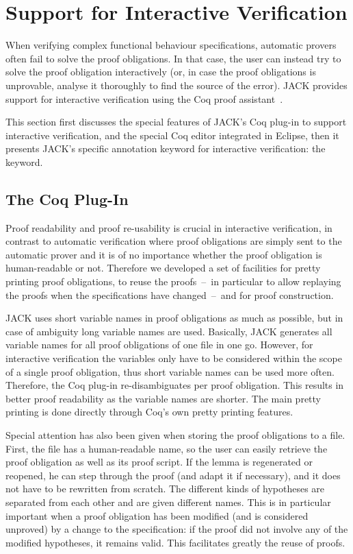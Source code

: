 

\section{Support for Interactive Verification}\label{SecInteractive}
When verifying complex functional behaviour specifications, automatic
provers often fail to solve the proof obligations. In that case, the
user can instead try to solve the proof obligation interactively (or,
in case the proof obligations is unprovable, analyse it thoroughly to
find the source of the error). JACK provides support for interactive
verification using the Coq proof assistant~\cite{Coq04}.

This section first discusses the special features of JACK's Coq
plug-in to support interactive verification, and the special Coq
editor integrated in Eclipse, then it presents JACK's specific
annotation keyword for interactive verification: the \native keyword.

\subsection{The Coq Plug-In}

Proof readability and proof re-usability is crucial in interactive
verification, in contrast to automatic verification where proof
obligations are simply sent to the automatic prover and it is of no
importance whether the proof obligation is human-readable or not.
Therefore we developed a set of facilities for pretty printing proof
obligations, to reuse the proofs~--~in particular to allow replaying
the proofs when the specifications have changed~--~and for proof
construction.

JACK uses short variable names in proof obligations as much as
possible, but in case of ambiguity long variable names are used.
Basically, JACK generates all variable names for all proof obligations
of one file in one go. However, for interactive verification the
variables only have to be considered within the scope of a single
proof obligation, thus short variable names can be used more often.
Therefore, the Coq plug-in re-disambiguates per proof obligation.
This results in better proof readability as the variable names are
shorter.  The main pretty printing is done directly through Coq's own
pretty printing features.


Special attention has also been given when storing the proof
obligations to a file. First, the file has a human-readable name, so
the user can easily retrieve the proof obligation as well as its proof
script. If the lemma is regenerated or reopened, he can step through
the proof (and adapt it if necessary), and it does not have to be
rewritten from scratch.  The different kinds of hypotheses are
separated from each other and are given different names.  This is in
particular important when a proof obligation has been modified (and is
considered unproved) by a change to the specification: if the proof
did not involve any of the modified hypotheses, it remains valid. This
facilitates greatly the reuse of proofs.

